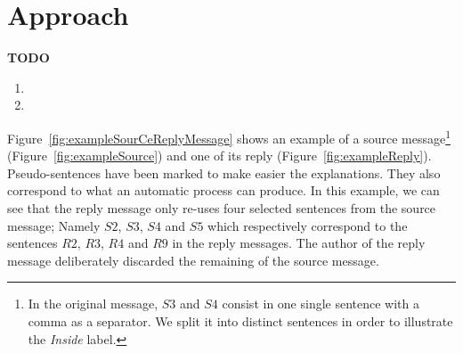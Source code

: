 
\section{Approach}
\label{}

\textbf{TODO}
\begin{enumerate}
\item 
\item 
\end{enumerate}


Figure~\ref{fig:exampleSourCeReplyMessage} shows an example of a source message\footnote{In the original message, $S3$ and $S4$ consist in one single sentence with a comma as a separator. We split it into distinct sentences in order to illustrate the \textit{Inside} label.} (Figure~\ref{fig:exampleSource}) and one of its reply (Figure~\ref{fig:exampleReply}).
Pseudo-sentences have been marked to make easier the explanations. 
They also correspond to what an automatic process can produce.
In this example, we can see that the reply message only re-uses four selected sentences from the source message; Namely $S2$, $S3$, $S4$ and $S5$ which respectively correspond to the sentences  $R2$, $R3$, $R4$ and $R9$ in the reply messages.
The author of the reply message deliberately discarded the remaining of the source message.


